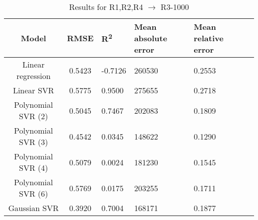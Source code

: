 \begin{table}[H]
\centering
\begin{adjustbox}{center}
\begin{tabular}{c | c M{1.2cm} M{2.5cm} M{2.5cm} M{1.8cm}}
Model & RMSE & R\textsuperscript{2} & Mean absolute error & Mean relative error \tabularnewline
\hline
Linear regression & 0.5423 & -0.7126 & 260530 & 0.2553 \\
Linear SVR & 0.5775 & 0.9500 & 275655 & 0.2718 \\
Polynomial SVR (2) & 0.5045 & 0.7467 & 202083 & 0.1809 \\
Polynomial SVR (3) & 0.4542 & 0.0345 & 148622 & 0.1290 \\
Polynomial SVR (4) & 0.5079 & 0.0024 & 181230 & 0.1545 \\
Polynomial SVR (6) & 0.5769 & 0.0175 & 203255 & 0.1711 \\
Gaussian SVR & 0.3920 & 0.7004 & 168171 & 0.1877 \\
\end{tabular}
\end{adjustbox}
\\
\caption{Results for R1,R2,R4 $\rightarrow$ R3-1000}
\label{tab:coreonly_linear_R1,R2,R4_R3_1000}
\end{table}
